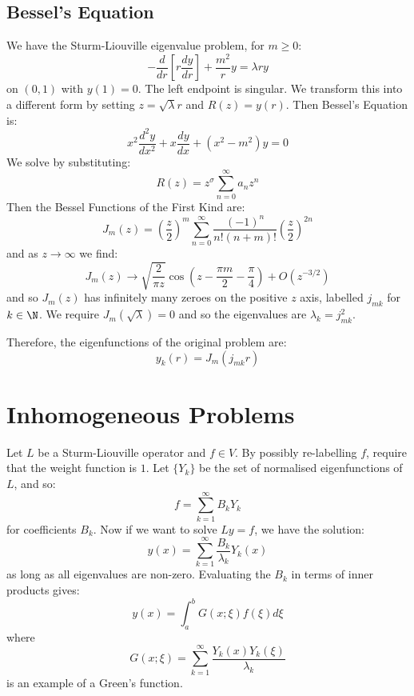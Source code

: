 \documentclass[../Main.tex]{subfiles}
\begin{document}
\subsection{Bessel's Equation}
We have the Sturm-Liouville eigenvalue problem, for $m \geq 0$:
\begin{equation*}
    -\frac{d}{dr} \left[r \frac{dy}{dr}\right] + \frac{m^2}{r} y = \lambda r y
\end{equation*}
on $(0, 1)$ with $y(1) = 0$. The left endpoint is singular. We transform this into a different form by setting $z = \sqrt{\lambda} r$ and $R(z) = y(r)$. Then Bessel's Equation is:
\begin{equation}
    x^2 \frac{d^{2}y}{dx^{2}} + x \frac{dy}{dx} + (x^2 - m^2) y = 0
    \label{eqnBessel}
\end{equation}
We solve by substituting:
\begin{equation*}
    R(z) = z^\sigma \sum_{n=0}^{\infty} a_n z^n
\end{equation*}
Then the Bessel Functions of the First Kind are:
\begin{equation*}
    J_m(z) = \left(\frac{z}{2}\right)^m \sum_{n=0}^{\infty} \frac{(-1)^n}{n!(n+m)!} \left(\frac{z}{2}\right)^{2n}
\end{equation*}
and as $z \to \infty$ we find:
\begin{equation*}
    J_m(z) \to \sqrt{\frac{2}{\pi z}} \cos\left(z - \frac{\pi m}{2} - \frac{\pi}{4}\right) + O(z^{-3/2})
\end{equation*}
and so $J_m(z)$ has infinitely many zeroes on the positive $z$ axis, labelled $j_{mk}$ for $k \in \N$. We require $J_m(\sqrt{\lambda}) = 0$ and so the eigenvalues are $\lambda_k = j_{mk}^2$.

Therefore, the eigenfunctions of the original problem are:
\begin{equation*}
    y_k(r) = J_m(j_{mk}r)
\end{equation*}
\section{Inhomogeneous Problems}
Let $L$ be a Sturm-Liouville operator and $f \in V$. By possibly re-labelling $f$, require that the weight function is $1$. Let $\{Y_k\}$ be the set of normalised eigenfunctions of $L$, and so:
\begin{equation*}
    f = \sum_{k=1}^{\infty} B_k Y_k
\end{equation*}
for coefficients $B_k$. Now if we want to solve $Ly = f$, we have the solution:
\begin{equation*}
    y(x) = \sum_{k=1}^{\infty} \frac{B_k}{\lambda_k} Y_k(x)
\end{equation*}
as long as all eigenvalues are non-zero. Evaluating the $B_k$ in terms of inner products gives:
\begin{equation*}
    y(x) = \int_{a}^{b} G(x;\xi)f(\xi) d\xi 
\end{equation*}
where
\begin{equation*}
    G(x;\xi) = \sum_{k=1}^{\infty} \frac{Y_k(x)Y_k(\xi)}{\lambda_k}
\end{equation*}
is an example of a Green's function.
\end{document}
